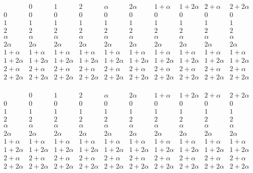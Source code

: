 \begin{enumerate}
\begin{enumerate}
    \[
    \begin{array}{c|cccccccccc}
        & 0 & 1 & 2 & \alpha & 2\alpha & 1+\alpha & 1+2\alpha & 2+\alpha & 2+2\alpha \\
    \hline
    0 & 0 & 0 & 0 & 0 & 0 & 0 & 0 & 0 & 0 \\
    1 & 1 & 1 & 1 & 1 & 1 & 1 & 1 & 1 & 1 \\
    2 & 2 & 2 & 2 & 2 & 2 & 2 & 2 & 2 & 2 \\
    \alpha & \alpha & \alpha & \alpha & \alpha & \alpha & \alpha & \alpha & \alpha & \alpha \\
    2\alpha & 2\alpha & 2\alpha & 2\alpha & 2\alpha & 2\alpha & 2\alpha & 2\alpha & 2\alpha & 2\alpha \\
    1+\alpha & 1+\alpha & 1+\alpha & 1+\alpha & 1+\alpha & 1+\alpha & 1+\alpha & 1+\alpha & 1+\alpha & 1+\alpha \\
    1+2\alpha & 1+2\alpha & 1+2\alpha & 1+2\alpha & 1+2\alpha & 1+2\alpha & 1+2\alpha & 1+2\alpha & 1+2\alpha & 1+2\alpha \\
    2+\alpha & 2+\alpha & 2+\alpha & 2+\alpha & 2+\alpha & 2+\alpha & 2+\alpha & 2+\alpha & 2+\alpha & 2+\alpha \\
    2+2\alpha & 2+2\alpha & 2+2\alpha & 2+2\alpha & 2+2\alpha & 2+2\alpha & 2+2\alpha & 2+2\alpha & 2+2\alpha & 2+2\alpha \\
    \end{array}
    \]

    \[
    \begin{array}{c|cccccccccc}
        & 0 & 1 & 2 & \alpha & 2\alpha & 1+\alpha & 1+2\alpha & 2+\alpha & 2+2\alpha \\
    \hline
    0 & 0 & 0 & 0 & 0 & 0 & 0 & 0 & 0 & 0 \\
    1 & 1 & 1 & 1 & 1 & 1 & 1 & 1 & 1 & 1 \\
    2 & 2 & 2 & 2 & 2 & 2 & 2 & 2 & 2 & 2 \\
    \alpha & \alpha & \alpha & \alpha & \alpha & \alpha & \alpha & \alpha & \alpha & \alpha \\
    2\alpha & 2\alpha & 2\alpha & 2\alpha & 2\alpha & 2\alpha & 2\alpha & 2\alpha & 2\alpha & 2\alpha \\
    1+\alpha & 1+\alpha & 1+\alpha & 1+\alpha & 1+\alpha & 1+\alpha & 1+\alpha & 1+\alpha & 1+\alpha & 1+\alpha \\
    1+2\alpha & 1+2\alpha & 1+2\alpha & 1+2\alpha & 1+2\alpha & 1+2\alpha & 1+2\alpha & 1+2\alpha & 1+2\alpha & 1+2\alpha \\
    2+\alpha & 2+\alpha & 2+\alpha & 2+\alpha & 2+\alpha & 2+\alpha & 2+\alpha & 2+\alpha & 2+\alpha & 2+\alpha \\
    2+2\alpha & 2+2\alpha & 2+2\alpha & 2+2\alpha & 2+2\alpha & 2+2\alpha & 2+2\alpha & 2+2\alpha & 2+2\alpha & 2+2\alpha \\
    \end{array}
    \]
        
    \end{enumerate}
\end{enumerate}


